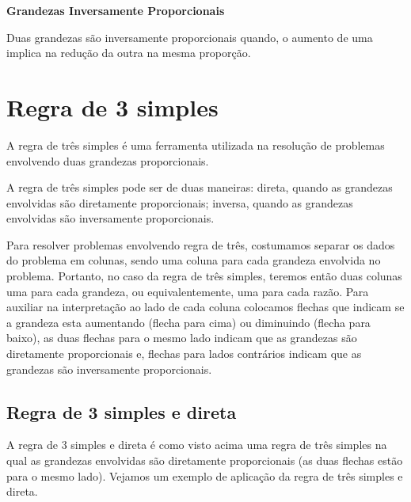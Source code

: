 \colorbox{azul}{
 \begin{minipage}{0.9\linewidth}
 \begin{center}
 \textbf{Grandezas Inversamente Proporcionais}

   Duas grandezas são inversamente proporcionais quando, o aumento de uma implica na redução da outra na mesma proporção.
 \end{center}
 \end{minipage}}

 \vskip0.3cm


\section{Regra de 3 simples}

A regra de três simples é uma ferramenta utilizada na resolução de problemas envolvendo duas grandezas proporcionais.

A regra de três simples pode ser de duas maneiras: direta, quando as grandezas envolvidas são diretamente proporcionais; inversa, quando as grandezas envolvidas são inversamente proporcionais.

Para resolver problemas envolvendo regra de três, costumamos separar os dados do problema em colunas, sendo uma coluna para cada grandeza envolvida no problema. Portanto, no caso da regra de três simples, teremos então duas colunas uma para cada grandeza, ou equivalentemente, uma para cada razão. Para auxiliar na interpretação ao lado de cada coluna colocamos flechas que indicam se a grandeza esta aumentando (flecha para cima) ou diminuindo (flecha para baixo), as duas flechas para o mesmo lado indicam que as grandezas são diretamente proporcionais e, flechas para lados contrários indicam que as grandezas são inversamente proporcionais.

\subsection{Regra de 3 simples e direta}

 A regra de 3 simples e direta é como visto acima uma regra de três simples na qual as grandezas envolvidas são diretamente proporcionais (as duas flechas estão para o mesmo lado). Vejamos um exemplo de aplicação da regra de três simples e direta.

